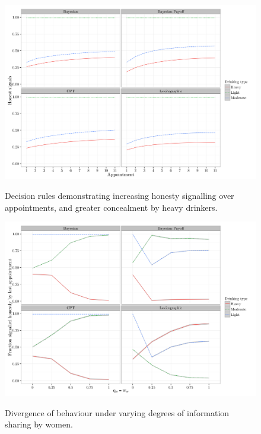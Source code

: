 \documentclass[twocolumn]{article}
\begin{document}
\begin{figure}[h!]{\includegraphics[width=\columnwidth]{honesty_plot}}
	\caption{Decision rules demonstrating increasing honesty signalling over appointments, and greater concealment by heavy drinkers.\label{fig_1}}
\end{figure}

\begin{figure}[h!]{\includegraphics[width=\columnwidth]{honesty_sharing}}
	\caption{Divergence of behaviour under varying degrees of information sharing by women.\label{fig_2}}
\end{figure}


\end{document}
